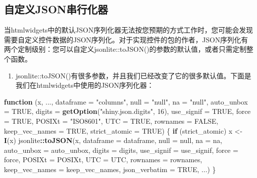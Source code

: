 \documentclass[]{book}
\newenvironment{Shaded}{\begin{snugshade}}{\end{snugshade}}
\newcommand{\KeywordTok}[1]{\textcolor[rgb]{0.13,0.29,0.53}{\textbf{#1}}}
\newcommand{\DataTypeTok}[1]{\textcolor[rgb]{0.13,0.29,0.53}{#1}}
\newcommand{\DecValTok}[1]{\textcolor[rgb]{0.00,0.00,0.81}{#1}}
\newcommand{\StringTok}[1]{\textcolor[rgb]{0.31,0.60,0.02}{#1}}
\newcommand{\OtherTok}[1]{\textcolor[rgb]{0.56,0.35,0.01}{#1}}
\newcommand{\ControlFlowTok}[1]{\textcolor[rgb]{0.13,0.29,0.53}{\textbf{#1}}}
\newcommand{\OperatorTok}[1]{\textcolor[rgb]{0.81,0.36,0.00}{\textbf{#1}}}
\newcommand{\NormalTok}[1]{#1}
\providecommand{\tightlist}{%
  \setlength{\itemsep}{0pt}\setlength{\parskip}{0pt}}
\theoremstyle{definition}
\theoremstyle{definition}
\theoremstyle{definition}
\theoremstyle{remark}
\begin{document}
\subsection{自定义JSON串行化器}\label{json}

当htmlwidgets中的默认JSON序列化器无法按您预期的方式工作时，您可能会发现需要自定义控件数据的JSON序列化。对于实现控件的包的作者，JSON序列化有两个定制级别：您可以自定义jsonlite::toJSON()的参数的默认值，或者只需定制整个函数。

\begin{enumerate}
\def\labelenumi{\arabic{enumi}.}
\tightlist
\item
  jsonlite::toJSON()有很多参数，并且我们已经改变了它的很多默认值。下面是我们在htmlwidgets中使用的JSON序列化器：
\end{enumerate}

\begin{Shaded}
\begin{Highlighting}[]
\ControlFlowTok{function}\NormalTok{ (x, ..., }\DataTypeTok{dataframe =} \StringTok{"columns"}\NormalTok{, }\DataTypeTok{null =} \StringTok{"null"}\NormalTok{, }\DataTypeTok{na =} \StringTok{"null"}\NormalTok{, }
    \DataTypeTok{auto_unbox =} \OtherTok{TRUE}\NormalTok{, }\DataTypeTok{digits =} \KeywordTok{getOption}\NormalTok{(}\StringTok{"shiny.json.digits"}\NormalTok{, }
        \DecValTok{16}\NormalTok{), }\DataTypeTok{use_signif =} \OtherTok{TRUE}\NormalTok{, }\DataTypeTok{force =} \OtherTok{TRUE}\NormalTok{, }\DataTypeTok{POSIXt =} \StringTok{"ISO8601"}\NormalTok{, }
    \DataTypeTok{UTC =} \OtherTok{TRUE}\NormalTok{, }\DataTypeTok{rownames =} \OtherTok{FALSE}\NormalTok{, }\DataTypeTok{keep_vec_names =} \OtherTok{TRUE}\NormalTok{, }\DataTypeTok{strict_atomic =} \OtherTok{TRUE}\NormalTok{) }
\NormalTok{\{}
    \ControlFlowTok{if}\NormalTok{ (strict_atomic) }
\NormalTok{        x <-}\StringTok{ }\KeywordTok{I}\NormalTok{(x)}
\NormalTok{    jsonlite}\OperatorTok{::}\KeywordTok{toJSON}\NormalTok{(x, }\DataTypeTok{dataframe =}\NormalTok{ dataframe, }\DataTypeTok{null =}\NormalTok{ null, }\DataTypeTok{na =}\NormalTok{ na, }
        \DataTypeTok{auto_unbox =}\NormalTok{ auto_unbox, }\DataTypeTok{digits =}\NormalTok{ digits, }\DataTypeTok{use_signif =}\NormalTok{ use_signif, }
        \DataTypeTok{force =}\NormalTok{ force, }\DataTypeTok{POSIXt =}\NormalTok{ POSIXt, }\DataTypeTok{UTC =}\NormalTok{ UTC, }\DataTypeTok{rownames =}\NormalTok{ rownames, }
        \DataTypeTok{keep_vec_names =}\NormalTok{ keep_vec_names, }\DataTypeTok{json_verbatim =} \OtherTok{TRUE}\NormalTok{, }
\NormalTok{        ...)}
\NormalTok{\}}
\end{Highlighting}
\end{Shaded}
\end{document}
